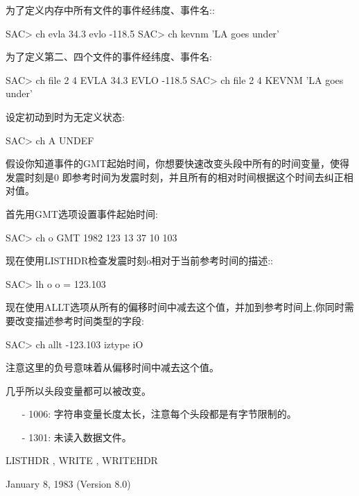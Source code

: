为了定义内存中所有文件的事件经纬度、事件名::
\begin{SACCode}
SAC> ch evla 34.3 evlo -118.5
SAC> ch kevnm 'LA goes under'
\end{SACCode}

为了定义第二、四个文件的事件经纬度、事件名:
\begin{SACCode}
SAC> ch file 2 4 EVLA 34.3 EVLO -118.5
SAC> ch file 2 4 KEVNM 'LA goes under'
\end{SACCode}

设定初动到时为无定义状态:
\begin{SACCode}
SAC> ch A UNDEF
\end{SACCode}

假设你知道事件的GMT起始时间，你想要快速改变头段中所有的时间变量，使得发震时刻是0
即参考时间为发震时刻，并且所有的相对时间根据这个时间去纠正相对值。

首先用GMT选项设置事件起始时间:
\begin{SACCode}
SAC> ch o GMT 1982 123 13 37 10 103
\end{SACCode}
现在使用LISTHDR检查发震时刻o相对于当前参考时间的描述::
\begin{SACCode}
SAC> lh o
 o = 123.103
\end{SACCode}
现在使用ALLT选项从所有的偏移时间中减去这个值，并加到参考时间上,你同时需要改变描述参考时间类型的字段:
\begin{SACCode}
SAC> ch allt -123.103 iztype iO
\end{SACCode}
注意这里的负号意味着从偏移时间中减去这个值。

几乎所以头段变量都可以被改变。

\begin{itemize}
\item[-]1006: 字符串变量长度太长，注意每个头段都是有字节限制的。
\item[-]1301: 未读入数据文件。
\end{itemize}

LISTHDR , WRITE , WRITEHDR

January 8, 1983 (Version 8.0)
